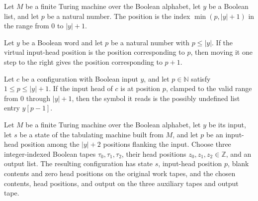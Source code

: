 \begin{definition}
\label{Complexity.Meyer.fpos}
\leanok
Let $M$ be a finite Turing machine over the Boolean alphabet, let $y$ be a Boolean list,
and let $p$ be a natural number. The position is the index $\min(p, |y|+1)$ in the
range from $0$ to $|y|+1$.
\end{definition}

\begin{theorem}
\label{Complexity.Meyer.moveInputPos_fpos}
\leanok
{}
Let $y$ be a Boolean word and let $p$ be a natural number with $p\le |y|$. If the
virtual input-head position is the position corresponding to $p$, then moving it one
step to the right gives the position corresponding to $p+1$.
\end{theorem}

\begin{theorem}
\label{Complexity.Meyer.inputSymbol_fpos}
\leanok
{}
Let $c$ be a configuration with Boolean input $y$, and let $p\in\mathbb{N}$ satisfy
$1\le p\le |y|+1$. If the input head of $c$ is at position $p$, clamped to the valid
range from $0$ through $|y|+1$, then the symbol it reads is the possibly undefined list
entry $y[p-1]$.
\end{theorem}

\begin{definition}
\label{Complexity.Meyer.acfg}
\leanok
{}
Let $M$ be a finite Turing machine over the Boolean alphabet, let $y$ be its input, let
$s$ be a state of the tabulating machine built from $M$, and let $p$ be an input-head
position among the $|y|+2$ positions flanking the input. Choose three integer-indexed
Boolean tapes $\tau_0,\tau_1,\tau_2$, their head positions $z_0,z_1,z_2\in\mathbb Z$,
and an output list. The resulting configuration has state $s$, input-head position $p$,
blank contents and zero head positions on the original work tapes, and the chosen
contents, head positions, and output on the three auxiliary tapes and output tape.
\end{definition}

